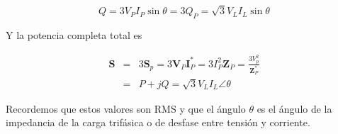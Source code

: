 \begin{equation*}
Q = 3V_P I_P \sin \theta = 3 Q_P = \sqrt{3} V_L I_L \sin \theta 
\end{equation*}

 Y la potencia completa total es

\begin{eqnarray*}
\mathbf{S} &=& 3\mathbf{S}_p = 3 \mathbf{V}_P \mathbf{I}_P^{*} = 3I_P^2\mathbf{Z}_P = \frac{3 V_p^2}{\mathbf{Z}_P^{*}} \\
&=& P + j Q = \sqrt{3} V_L I_L \angle \theta
\end{eqnarray*}

Recordemos que estos valores son RMS y que el ángulo $\theta$ es el ángulo de la impedancia de la carga trifásica o de desfase entre tensión y corriente.
